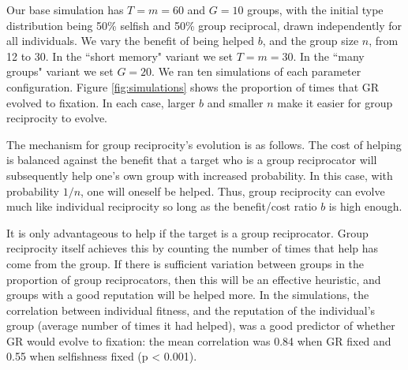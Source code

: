 \documentclass[12pt,a4paper]{article}\usepackage[]{graphicx}\usepackage[]{color}
\begin{document}
Our base simulation has $T = m = 60$ and $G = 10$ groups, with the initial type distribution being 50\% selfish and
50\% group reciprocal, drawn independently for all individuals. We vary the benefit of being helped $b$, and the 
group size $n$, from 12 to 30. In the ``short memory" variant we set $T = m = 30$. In the ``many groups" variant 
we set $G = 20$. We ran ten simulations of each parameter configuration. Figure \ref{fig:simulations} shows the proportion of times that GR evolved to fixation. In each case, larger $b$ and smaller $n$ make it easier for
group reciprocity to evolve.




The mechanism for group reciprocity's evolution is as follows. The cost of helping is balanced against the benefit
that a target who is a group reciprocator will subsequently help one's own group with increased probability. In this
case, with probability $1/n$, one will oneself be helped. Thus, group reciprocity can evolve much like individual
reciprocity so long as the benefit/cost ratio $b$ is high enough. 


It is only advantageous to help if the target is a group reciprocator. Group reciprocity itself achieves this by
counting the number of times that help has come from the group. If there is sufficient variation between groups in the
proportion of group reciprocators, then this will be an effective heuristic, and groups with a good reputation will be
helped more. In the simulations, the correlation between
individual fitness, and the reputation of the individual's group (average number of times it had helped), was a good
predictor of whether GR would evolve to fixation: the mean correlation was 0.84 when GR fixed and 0.55 when selfishness fixed (p < 0.001).
\end{document}
